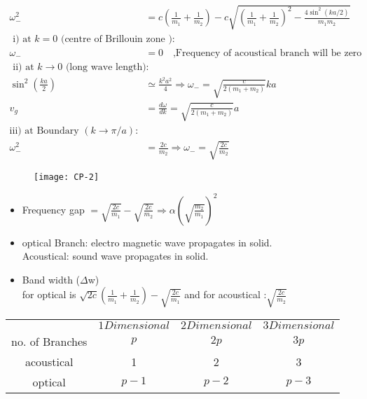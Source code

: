 \begin{align*}
\omega_{-}^{2}&=c\left(\frac{1}{m_{1}}+\frac{1}{m_{2}}\right)-c \sqrt{\left(\frac{1}{m_{1}}+\frac{1}{m_{2}}\right)^{2}-\frac{4 \sin ^{2}(k a / 2)}{m_{1} m_{2}}}\\
\text { i) at } k=0 \text { (centre of Brillouin zone}  \text { ): }&\\
\omega_{-}&=0 \quad \text{,Frequency of acoustical branch will be zero}\\
\text { ii) at } k \rightarrow 0 \text { (long wave length): }&\\
\sin ^{2}\left(\frac{k a}{2}\right) &\simeq \frac{k^{2} a^{2}}{4} \Rightarrow \omega_{-}=\sqrt{\frac{c}{2\left(m_{1}+m_{2}\right)}} k a\\
v_{g}&=\frac{d\omega}{d k}=\sqrt{\frac{c}{2\left(m_{1}+m_{2}\right)}} a\\
\text{iii) at Boundary }(k \rightarrow \pi / a):&\\
\omega_{-}^{2}&=\frac{2 c}{m_{2}} \Rightarrow \omega_{-}=\sqrt{\frac{2 c}{m_{2}}}
\end{align*}
\begin{figure}[H]
	\centering
	\texttt{[image: CP-2]}
\end{figure}
\begin{itemize}
	\item Frequency gap $=\sqrt{\frac{2 c}{m_{1}}}-\sqrt{\frac{2 c}{m_{2}}} \Rightarrow \alpha\left(\sqrt{\frac{m_{2}}{m_{1}}}\right)^{2}$
	\item optical Branch: electro magnetic wave propagates in solid.\\ Acoustical: sound wave propagates in solid.
	\item Band width ($\Delta$w)\\
	for optical is
$	\sqrt{2 c}\left(\frac{1}{m_{1}}+\frac{1}{m_{2}}\right)-\sqrt{\frac{2 c}{m_{1}}}$
	  and for acoustical :$\sqrt{\frac{2 c}{m_{2}}} $
\end{itemize}
\renewcommand*{\arraystretch}{1.5}
\begin{tabular}{|c|c|c|c|} 
	\hline
	& $1Dimensional$ & $2Dimensional$ & $3Dimensional$ \\
	\cline { 2 - 4 } no. of Branches & $p$ & $2 p$ & $3 p$ \\
	\hline acoustical & 1 & 2 & 3 \\
	\hline optical & $p-1$ & $p-2$ & $p-3$\\
	\hline
\end{tabular}
